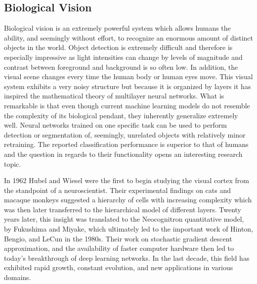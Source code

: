 %

\subsection{Biological Vision}


Biological vision is an extremely powerful system which allows humans the ability, and seemingly without effort, to recognize an enormous amount of distinct objects in the world. 
Object detection is extremely difficult and therefore is especially impressive as light intensities can change by levels of magnitude and contrast between foreground and background is so often low. 
In addition, the visual scene changes every time the human body or human eyes move. 
This visual system exhibits a very noisy structure but because it is organized by layers it has inspired the mathematical theory of multilayer neural networks. 
What is remarkable is that even though current machine learning models do not resemble the complexity of its biological pendant, they inherently generalize extremely well. 
Neural networks trained on one specific task can be used to perform detection or segmentation of, seemingly, unrelated objects with relatively minor retraining. 
The reported classification performance is superior to that of humans and the question in regards to their functionality opens an interesting research topic.

In 1962 Hubel and Wiesel were the first to begin studying the visual cortex from the standpoint of a neuroscientist. Their experimental findings on cats and macaque monkeys suggested a hierarchy of cells with increasing complexity which was then later transferred to the hierarchical model of different layers. Twenty years later, this insight was translated to the Neocognitron quantitative model, by Fukushima and Miyake, which ultimately led to the important work of Hinton, Bengio, and LeCun in the 1980s. Their work on stochastic gradient descent approximation, and the availability of faster computer hardware then led to today’s breakthrough of deep learning networks. In the last decade, this field has exhibited rapid growth, constant evolution, and new applications in various domains.




